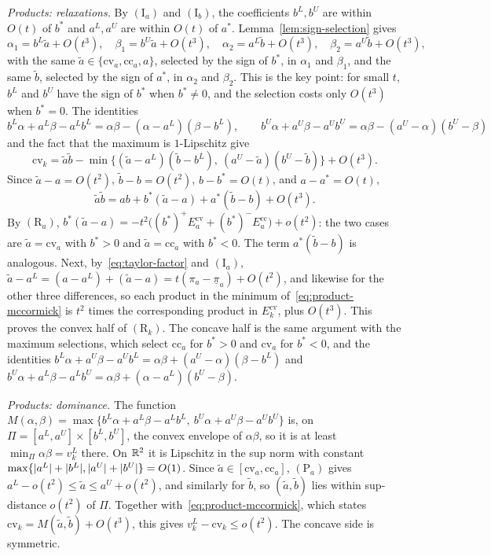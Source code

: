 \emph{Products: relaxations.} By $(\mathrm I_a)$ and $(\mathrm I_b)$, the
coefficients $b^L,b^U$ are within $O(t)$ of $b^*$ and $a^L,a^U$ are within
$O(t)$ of $a^*$. Lemma~\ref{lem:sign-selection} gives
\[
  \alpha_1=b^L\tilde a+O(t^3),\quad\beta_1=b^U\tilde a+O(t^3),\quad
  \alpha_2=a^L\tilde b+O(t^3),\quad\beta_2=a^U\tilde b+O(t^3),
\]
with the same $\tilde a\in\{\mathrm{cv}_a,\mathrm{cc}_a,a\}$, selected by the
sign of $b^*$, in $\alpha_1$ and $\beta_1$, and the same $\tilde b$, selected
by the sign of $a^*$, in $\alpha_2$ and $\beta_2$. This is the key point: for
small $t$, $b^L$ and $b^U$ have the sign of $b^*$ when $b^*\ne0$, and the
selection costs only $O(t^3)$ when $b^*=0$. The identities
\[
  b^L\alpha+a^L\beta-a^Lb^L=\alpha\beta-(\alpha-a^L)(\beta-b^L),\qquad
  b^U\alpha+a^U\beta-a^Ub^U=\alpha\beta-(a^U-\alpha)(b^U-\beta)
\]
and the fact that the maximum is $1$-Lipschitz give
\begin{equation}\label{eq:product-mccormick}
  \mathrm{cv}_k=\tilde a\tilde b
  -\min\bigl\{(\tilde a-a^L)(\tilde b-b^L),\ (a^U-\tilde a)(b^U-\tilde b)\bigr\}
  +O(t^3).
\end{equation}
Since $\tilde a-a=O(t^2)$, $\tilde b-b=O(t^2)$, $b-b^*=O(t)$, and $a-a^*=O(t)$,
\[
  \tilde a\tilde b=ab+b^*(\tilde a-a)+a^*(\tilde b-b)+O(t^3).
\]
By $(\mathrm R_a)$, $b^*(\tilde a-a)=-t^2\bigl((b^*)^+E_a^{\mathrm{cv}}+(b^*)^-E_a^{\mathrm{cc}}\bigr)+o(t^2)$:
the two cases are $\tilde a=\mathrm{cv}_a$ with $b^*>0$ and
$\tilde a=\mathrm{cc}_a$ with $b^*<0$. The term $a^*(\tilde b-b)$ is
analogous. Next, by~\eqref{eq:taylor-factor} and $(\mathrm I_a)$,
$\tilde a-a^L=(a-a^L)+(\tilde a-a)=t(\pi_a-\underline\pi_a)+O(t^2)$, and
likewise for the other three differences, so each product in the minimum
of~\eqref{eq:product-mccormick} is $t^2$ times the corresponding product in
$E_k^{\mathrm{cv}}$, plus $O(t^3)$. This proves the convex half of
$(\mathrm R_k)$. The concave half is the same argument with the maximum
selections, which select $\mathrm{cc}_a$ for $b^*>0$ and $\mathrm{cv}_a$ for
$b^*<0$, and the identities
$b^L\alpha+a^U\beta-a^Ub^L=\alpha\beta+(a^U-\alpha)(\beta-b^L)$ and
$b^U\alpha+a^L\beta-a^Lb^U=\alpha\beta+(\alpha-a^L)(b^U-\beta)$.

\emph{Products: dominance.} The function
$M(\alpha,\beta)=\max\{b^L\alpha+a^L\beta-a^Lb^L,\ b^U\alpha+a^U\beta-a^Ub^U\}$
is, on $\Pi=[a^L,a^U]\times[b^L,b^U]$, the convex envelope of $\alpha\beta$,
so it is at least $\min_\Pi\alpha\beta=v_k^L$ there. On $\mathbb{R}^2$ it is Lipschitz in
the sup norm with constant $\max\{\lvert a^L\rvert+\lvert b^L\rvert,\lvert a^U\rvert+\lvert b^U\rvert\}=O(1)$.
Since $\tilde a\in[\mathrm{cv}_a,\mathrm{cc}_a]$, $(\mathrm P_a)$ gives
$a^L-o(t^2)\le\tilde a\le a^U+o(t^2)$, and similarly for $\tilde b$, so
$(\tilde a,\tilde b)$ lies within sup-distance $o(t^2)$ of $\Pi$. Together
with~\eqref{eq:product-mccormick}, which states $\mathrm{cv}_k=M(\tilde a,\tilde b)+O(t^3)$,
this gives $v_k^L-\mathrm{cv}_k\le o(t^2)$. The concave side is symmetric.

